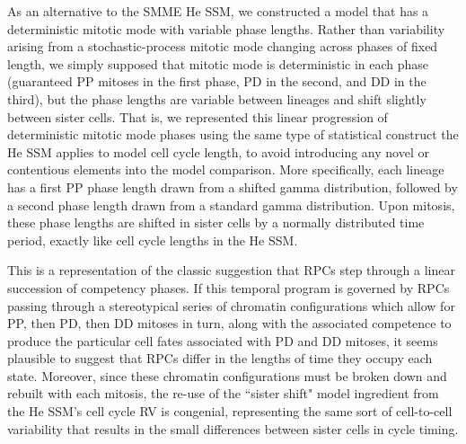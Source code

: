 As an alternative to the SMME He SSM, we constructed a model that has a deterministic mitotic mode with variable phase lengths. Rather than variability arising from a stochastic-process mitotic mode changing across phases of fixed length, we simply supposed that mitotic mode is deterministic in each phase (guaranteed PP mitoses in the first phase, PD in the second, and DD in the third), but the phase lengths are variable between lineages and shift slightly between sister cells. That is, we represented this linear progression of deterministic mitotic mode phases using the same type of statistical construct the He SSM applies to model cell cycle length, to avoid introducing any novel or contentious elements into the model comparison. More specifically, each lineage has a first PP phase length drawn from a shifted gamma distribution, followed by a second phase length drawn from a standard gamma distribution. Upon mitosis, these phase lengths are shifted in sister cells by a normally distributed time period, exactly like cell cycle lengths in the He SSM.

This is a representation of the classic suggestion that RPCs step through a linear succession of competency phases. If  this temporal program is governed by RPCs passing through a stereotypical series of chromatin configurations which allow for PP, then PD, then DD mitoses in turn, along with the associated competence to produce the particular cell fates associated with PD and DD mitoses, it seems plausible to suggest that RPCs differ in the lengths of time they occupy each state. Moreover, since these chromatin configurations must be broken down and rebuilt with each mitosis, the re-use of the ``sister shift" model ingredient from the He SSM's cell cycle RV is congenial, representing the same sort of cell-to-cell variability that results in the small differences between sister cells in cycle timing. 

